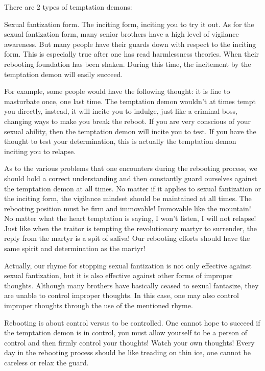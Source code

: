 \documentclass[
]{book}
\begin{document}
There are 2 types of temptation demons:

Sexual fantization form.
The inciting form, inciting you to try it out.
As for the sexual fantization form, many senior brothers have a high level of vigilance awareness. But many people have their guards down with respect to the inciting form. This is especially true after one has read harmlessness theories. When their rebooting foundation has been shaken. During this time, the incitement by the temptation demon will easily succeed.

For example, some people would have the following thought: it is fine to masturbate once, one last time. The temptation demon wouldn't at times tempt you directly, instead, it will incite you to indulge, just like a criminal boss, changing ways to make you break the reboot. If you are very conscious of your sexual ability, then the temptation demon will incite you to test. If you have the thought to test your determination, this is actually the temptation demon inciting you to relapse.

As to the various problems that one encounters during the rebooting process, we should hold a correct understanding and then constantly guard ourselves against the temptation demon at all times. No matter if it applies to sexual fantization or the inciting form, the vigilance mindset should be maintained at all times. The rebooting position must be firm and immovable! Immovable like the mountain! No matter what the heart temptation is saying, I won't listen, I will not relapse! Just like when the traitor is tempting the revolutionary martyr to surrender, the reply from the martyr is a spit of saliva! Our rebooting efforts should have the same spirit and determination as the martyr!

Actually, our rhyme for stopping sexual fantization is not only effective against sexual fantization, but it is also effective against other forms of improper thoughts. Although many brothers have basically ceased to sexual fantasize, they are unable to control improper thoughts. In this case, one may also control improper thoughts through the use of the mentioned rhyme.

Rebooting is about control versus to be controlled. One cannot hope to succeed if the temptation demon is in control, you must allow yourself to be a person of control and then firmly control your thoughts! Watch your own thoughts! Every day in the rebooting process should be like treading on thin ice, one cannot be careless or relax the guard.
\end{document}
